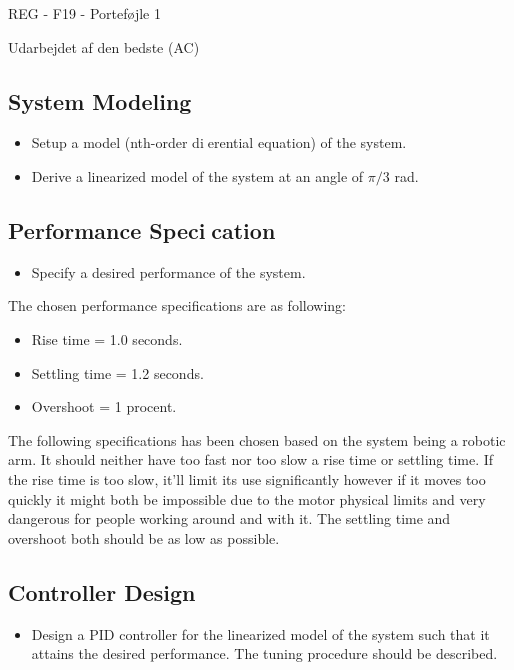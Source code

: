 \documentclass[12pt]{article}
\begin{document}
\raggedright
\huge
REG - F19 - Porteføjle 1 \linebreak
\normalsize

\large
Udarbejdet af den bedste (AC)

\subsection*{System Modeling}
\begin{itemize}
  \item Setup a model (nth-order dierential equation) of the system.
  \item Derive a linearized model of the system at an angle of $\pi/3$ rad.
\end{itemize}

\subsection*{Performance Specication}
\begin{itemize}
  \item Specify a desired performance of the system.
\end{itemize}
The chosen performance specifications are as following:
\begin{itemize}
  \item Rise time = 1.0 seconds.
  \item Settling time = 1.2 seconds.
  \item Overshoot = 1 procent.
\end{itemize}
 The following specifications has been chosen based on the system being a robotic arm. It should neither have too fast nor too slow a rise time or settling time. If the rise time is too slow, it'll limit its use significantly however if it moves too quickly it might both be impossible due to the motor physical limits and very dangerous for people working around and with it. The settling time and overshoot both should be as low as possible.
\subsection*{Controller Design}
\begin{itemize}
  \item Design a PID controller for the linearized model of the system such that it attains the desired performance. The tuning procedure should be described.
\end{itemize}
\end{document}
